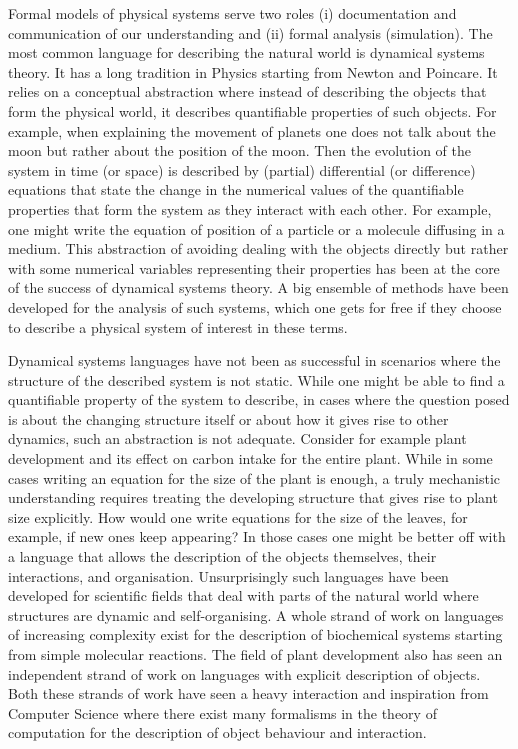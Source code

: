 Formal models of physical systems serve two roles (i) documentation and
communication of our understanding and (ii) formal analysis (simulation). The
most common language for describing the natural world is dynamical systems
theory. It has a long tradition in Physics starting from Newton and Poincare. It
relies on a conceptual abstraction where instead of describing the objects that
form the physical world, it describes quantifiable properties of such
objects. For example, when explaining the movement of planets one does not talk
about the moon but rather about the position of the moon. Then the evolution of
the system in time (or space) is described by (partial) differential (or
difference) equations that state the change in the numerical values of the
quantifiable properties that form the system as they interact with each
other. For example, one might write the equation of position of a particle or a
molecule diffusing in a medium. This abstraction of avoiding dealing with the
objects directly but rather with some numerical variables representing their
properties has been at the core of the success of dynamical systems theory. A
big ensemble of methods have been developed for the analysis of such systems,
which one gets for free if they choose to describe a physical system of interest
in these terms.

Dynamical systems languages have not been as successful in scenarios where the
structure of the described system is not static. While one might be able to find
a quantifiable property of the system to describe, in cases where the question
posed is about the changing structure itself or about how it gives rise to other
dynamics, such an abstraction is not adequate. Consider for example plant
development and its effect on carbon intake for the entire plant. While in some
cases writing an equation for the size of the plant is enough, a truly
mechanistic understanding requires treating the developing structure that gives
rise to plant size explicitly. How would one write equations for the size of the
leaves, for example, if new ones keep appearing?  In those cases one might be
better off with a language that allows the description of the objects
themselves, their interactions, and organisation. Unsurprisingly such languages
have been developed for scientific fields that deal with parts of the natural
world where structures are dynamic and self-organising. A whole strand of work
on languages of increasing complexity exist for the description of biochemical
systems starting from simple molecular reactions. The field of plant development
also has seen an independent strand of work on languages with explicit
description of objects.  Both these strands of work have seen a heavy
interaction and inspiration from Computer Science where there exist many
formalisms in the theory of computation for the description of object behaviour
and interaction.

